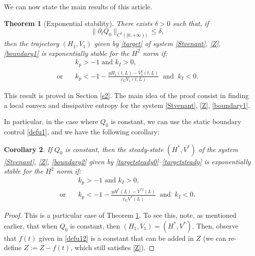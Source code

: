 \documentclass[JEP,XML,SOM,Unicode]{cedram}
\newtheorem{thm}{Theorem}[section]
\newtheorem{cor}[thm]{Corollary}
\theoremstyle{definition}
\begin{document}
We can now state the main results of this article.

\begin{thm}[Exponential stability]\label{th1}
There exists $\delta>0$ such that, if
\[
\lVert\partial_{t}Q_{0}\rVert_{C^{3}([0,+\infty))}\leq \delta,
\]
then the trajectory $(H_{1},V_{1})$ given by \eqref{target} of system \eqref{Stvenant}, \eqref{Z}, \eqref{boundary1} is exponentially stable for the $H^{2}$ norm if:
\begin{equation}
\begin{split}
&k_{p}>-1\text{ and }k_{I}>0,\\
\text{or}\quad&k_{p}<-1-\frac{gH_{1}(t,L)-V^{2}_{1}(t,L)}{v_{G}V_{1}(t,L)}\;\;\text{and}\;\;k_{I}<0.
\end{split}
\label{cond}
\end{equation}
\end{thm}
This result is proved in Section \ref{s2}.
The main idea of the proof consist in finding a local convex and dissipative entropy for the system \eqref{Stvenant}, \eqref{Z}, \eqref{boundary1}.

In particular, in the case where $Q_{0}$ is constant, we can use the static boundary control \eqref{defu1}, and we have the following corollary:
\begin{cor}\label{cor1}
If $Q_{0}$ is constant, then the steady-state $(H^{*},V^{*})$ of the system \eqref{Stvenant}, \eqref{Z}, \eqref{boundary2} given by \eqref{targetsteady0}--\eqref{targetsteady}
is exponentially stable for the $H^{2}$ norm if:
\begin{equation}
\label{cond1}
\begin{split}
&k_{p}>-1\text{ and }k_{I}>0,\\
\text{or}\quad&k_{p}<-1-\frac{gH^{*}(L)-V^{*2}(L)}{v_{G}V^{*}(L)}\;\;\text{and}\;\;k_{I}<0.
\end{split}
\end{equation}
\end{cor}
\begin{proof}
This is a particular case of Theorem \ref{th1}. To see this, note, as mentioned earlier, that when $Q_{0}$ is constant, then $(H_{1},V_{1})=(H^{*},V^{*})$.
Then, observe that $f(t)$ given in \eqref{defu12} is a constant that can be added in $Z$ (\ie we can re-define $Z:=Z-f(t)$, which still satisfies \eqref{Z}).
\end{proof}
\end{document}
